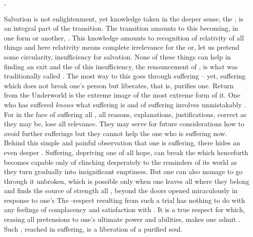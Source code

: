 \sep

\pa Salvation is not enlightenment, yet knowledge taken in the deeper sense, the
, is an integral part of the transition. The
transition amounts to this  becoming, in one form or
another, . This knowledge amounts to recognition of
relativity of all  things and here relativity means complete
irrelevance for the  or, let us pretend some circularity,
insufficiency for salvation. None of these things can help in finding an exit
and the  of this insufficiency, the renouncement of , is
what was traditionally called . The most  way to this
 goes through suffering -- yet, suffering which does not break
one's person but liberates, that is, purifies one.  Return from the Underworld
is the extreme image of the most extreme form of it.  One who has suffered {\em
  knows} what suffering is and  of suffering involves unmistakably
. For in the face of suffering all , all reasons,
explanations, justifications, correct as they may be, lose all relevance. They
may serve for future considerations how to avoid further sufferings but they
cannot help the one who is suffering now. Behind this simple and painful
observation that one is suffering, there hides an even deeper .
Suffering, depriving one of all  hope, can break the  which
henceforth becomes capable only of clinching desperately to the reminders 
of its  world as they turn gradually into insignificant emptiness.
But one can also manage to go through it unbroken, 
which is possible only when one leaves all  where they belong and
finds the source of strength  all , beyond the
doors opened miraculously in response to one's  The
-respect resulting from such a trial has nothing to do with any
feelings of complacency and satisfaction with . It is a true respect
for  which, erasing all pretensions to one's ultimate power and
abilities, makes one admit . Such , reached
in suffering, is a liberation of a purified soul. 

